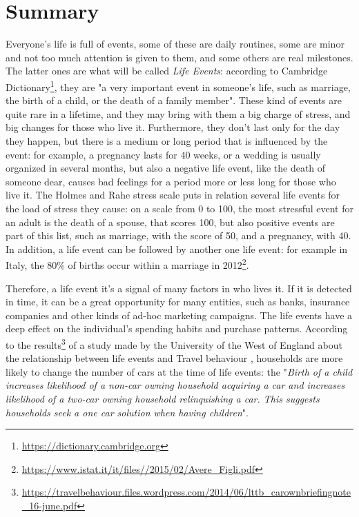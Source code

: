 \chapter*{Summary} %
\label{summary}


Everyone's life is full of events, some of these are daily routines, some are minor and not too much attention is given to them, and some others are real milestones. The latter ones are what will be called \textit{Life Events}: according to Cambridge Dictionary\footnote{\url{https://dictionary.cambridge.org}}, they are "a very important event in someone's life, such as marriage, the birth of a child, or the death of a family member". These kind of events are quite rare in a lifetime, and they may bring with them a big charge of stress, and big changes for those who live it. Furthermore, they don't last only for the day they happen, but there is a medium or long period that is influenced by the event: for example, a pregnancy lasts for 40 weeks, or a wedding is usually organized in several months, but also a negative life event, like the death of someone dear, causes bad feelings for a period more or less long for those who live it. The Holmes and Rahe stress scale \cite{holmes1967social} puts in relation several life events for the load of stress they cause: on a scale from 0 to 100, the most stressful event for an adult is the death of a spouse, that scores 100, but also positive events are part of this list, such as marriage, with the score of 50, and a pregnancy, with 40. In addition, a life event can be followed by another one life event: for example in Italy, the 80\% of births occur within a marriage in 2012\footnote{\url{https://www.istat.it/it/files//2015/02/Avere_Figli.pdf}}.

Therefore, a life event it's a signal of many factors in who lives it. If it is detected in time, it can be a great opportunity for many entities, such as banks, insurance companies and other kinds of ad-hoc marketing campaigns. The life events have a deep effect on the individual's spending habits and purchase patterns. According to the results\footnote{\url{https://travelbehaviour.files.wordpress.com/2014/06/lttb_carownbriefingnote_16-june.pdf}} of a study made by the University of the West of England about the relationship between life events and Travel behaviour \cite{chatterjee2015facts}, households are more likely to change the number of cars at the time of life events: the "\textit{Birth of a child increases likelihood of a non-car owning household acquiring a car and increases likelihood of a two-car owning household relinquishing a car. This suggests households seek a one car solution when having children}".

